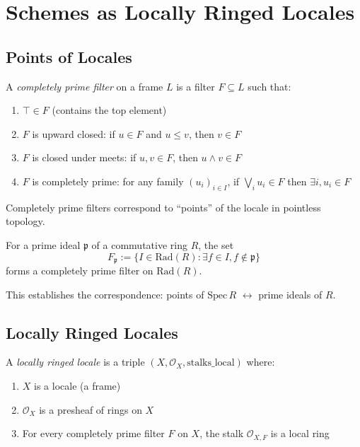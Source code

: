 \chapter{Schemes as Locally Ringed Locales}

\section{Points of Locales}

\begin{definition}
  \label{def:completely-prime-filter}
  \leanok
  A \emph{completely prime filter} on a frame $L$ is a filter $F \subseteq L$ such that:
  \begin{enumerate}
    \item $\top \in F$ (contains the top element)
    \item $F$ is upward closed: if $u \in F$ and $u \leq v$, then $v \in F$
    \item $F$ is closed under meets: if $u, v \in F$, then $u \land v \in F$
    \item $F$ is completely prime: for any family $(u_i)_{i \in I}$, if $\bigvee_i u_i \in F$ then $\exists i, u_i \in F$
  \end{enumerate}

  Completely prime filters correspond to ``points'' of the locale in pointless topology.
\end{definition}

\begin{theorem}
  \label{thm:prime-ideal-to-filter}
  \leanok
  For a prime ideal $\mathfrak{p}$ of a commutative ring $R$, the set
  $$F_{\mathfrak{p}} := \{I \in \mathrm{Rad}(R) : \exists f \in I, f \notin \mathfrak{p}\}$$
  forms a completely prime filter on $\mathrm{Rad}(R)$.

  This establishes the correspondence: points of $\mathrm{Spec}\, R$ $\leftrightarrow$ prime ideals of $R$.
\end{theorem}

\section{Locally Ringed Locales}

\begin{definition}
  \label{def:locally-ringed-locale}
  \leanok
  A \emph{locally ringed locale} is a triple $(X, \mathcal{O}_X, \text{stalks\_local})$ where:
  \begin{enumerate}
    \item $X$ is a locale (a frame)
    \item $\mathcal{O}_X$ is a presheaf of rings on $X$
    \item For every completely prime filter $F$ on $X$, the stalk $\mathcal{O}_{X,F}$ is a local ring
  \end{enumerate}
\end{definition}

